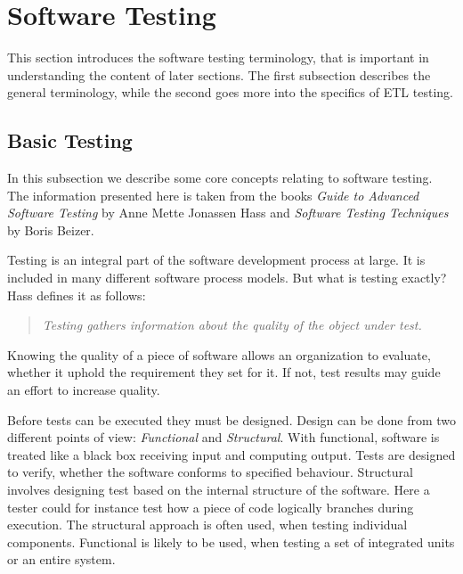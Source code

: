 \section{Software Testing}\label{sect:btesting}

This section introduces the software testing terminology, that is important in understanding the content of later sections. The first subsection describes the general terminology, while the second goes more into the specifics of ETL testing.

\subsection{Basic Testing}
In this subsection we describe some core concepts relating to software testing. The information presented here is taken from the books \textit{Guide to Advanced Software Testing} by Anne Mette Jonassen Hass\cite{Hass} and \textit{Software Testing Techniques} by Boris Beizer\cite{Beizer}.

Testing is an integral part of the software development process at large. It is included in many different software process models. But what is testing exactly? Hass defines it as follows:
\begin{quotation} \textit{Testing gathers information about the quality of the object under test.}\end{quotation}
Knowing the quality of a piece of software allows an organization to evaluate, whether it uphold the requirement they set for it. If not, test results may guide an effort to increase quality.

Before tests can be executed they must be designed. Design can be done from two different points of view: \emph{Functional} and \emph{Structural}. With functional, software is treated like a black box receiving input and computing output. Tests are designed to verify, whether the software conforms to specified behaviour. Structural involves designing test based on the internal structure of the software. Here a tester could for instance test how a piece of code logically branches during execution. The structural approach is often used, when testing individual components. Functional is likely to be used, when testing a set of integrated units or an entire system.

